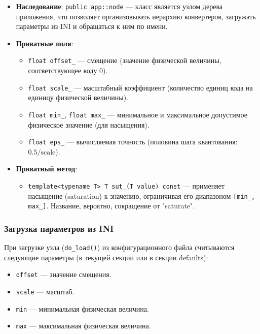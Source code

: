 \documentclass[a4paper,12pt]{article}
\begin{document}
\begin{itemize}
    \item \textbf{Наследование}: \texttt{public app::node} — класс является узлом дерева приложения, что позволяет организовывать иерархию конвертеров, загружать параметры из INI и обращаться к ним по имени.
    \item \textbf{Приватные поля}:
        \begin{itemize}
            \item \texttt{float offset\_} — смещение (значение физической величины, соответствующее коду 0).
            \item \texttt{float scale\_} — масштабный коэффициент (количество единиц кода на единицу физической величины).
            \item \texttt{float min\_}, \texttt{float max\_} — минимальное и максимальное допустимое физическое значение (для насыщения).
            \item \texttt{float eps\_} — вычисляемая точность (половина шага квантования: \(0.5 / \text{scale}\)).
        \end{itemize}
    \item \textbf{Приватный метод}:
        \begin{itemize}
            \item \texttt{template<typename T> T sut\_(T value) const} — применяет насыщение (saturation) к значению, ограничивая его диапазоном \texttt{[min\_, max\_]}. Название, вероятно, сокращение от "saturate".
        \end{itemize}
\end{itemize}

\subsubsection{Загрузка параметров из INI}

При загрузке узла (\texttt{do\_load()}) из конфигурационного файла считываются следующие параметры (в текущей секции или в секции defaults):

\begin{itemize}
    \item \texttt{offset} — значение смещения.
    \item \texttt{scale} — масштаб.
    \item \texttt{min} — минимальная физическая величина.
    \item \texttt{max} — максимальная физическая величина.
\end{itemize}
\end{document}
